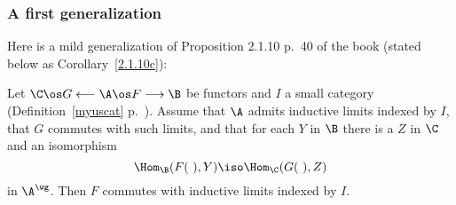 \documentclass[12pt]{article}
\theoremstyle{remark}
\theoremstyle{definition}
\begin{document}
\subsubsection{A first generalization}

Here is a mild generalization of Proposition 2.1.10 p.~40 of the book (stated below as Corollary~\ref{2.1.10c}): 

\begin{prop}
Let $\C\os G\longleftarrow\A\os F\longrightarrow\B$ be functors and $I$ a small category (Definition~\ref{myuscat} p.~). Assume that $\A$ admits inductive limits indexed by $I$, that $G$ commutes with such limits, and that for each $Y$ in $\B$ there is a $Z$ in $\C$ and an isomorphism 
$$
\Hom_\B(F(\ ),Y)\iso\Hom_\C(G(\ ),Z)
$$
in $\A^\wg$. Then $F$ commutes with inductive limits indexed by $I$.
\end{prop}

\end{document}
